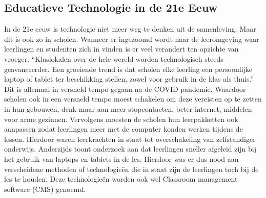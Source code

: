 \subsection{Educatieve Technologie in de 21e Eeuw}
In de 21e eeuw is technologie niet meer weg te denken uit de samenleving. Maar dit is ook zo in scholen. Wanneer er ingezoomd wordt naar de leeromgeving waar leerlingen en studenten zich in vinden is er veel verandert ten opzichte van vroeger. ``Klaslokalen over de hele wereld worden technologisch steeds geavanceerder. Een groeiende trend is dat scholen elke leerling een persoonlijke laptop of tablet ter beschikking stellen, zowel voor gebruik in de klas als thuis.'' \textcite{HALL2021101957} Dit is allemaal in versneld tempo gegaan na de COVID pandemie. Waardoor scholen ook in een versneld tempo moest schakelen om deze vereisten op te zetten in hun gebouwen, denk maar aan meer stopcontacten, beter internet, middelen voor arme gezinnen.\newline
Vervolgens moesten de scholen hun leerpakketten ook aanpassen zodat leerlingen meer met de computer konden werken tijdens de lessen. Hierdoor waren leerkrachten in staat tot overschakeling van zelfstandiger onderwijs. Anderzijds toont onderzoek aan dat leerlingen sneller afgeleid zijn bij het gebruik van laptops en tablets in de les. \textcite{deng2020laptops} Hierdoor was er dus nood aan verscheidene methoden of technologieën die in staat zijn de leerlingen toch bij de les te houden. Deze technologieën worden ook wel Classroom management software (CMS) genoemd.

